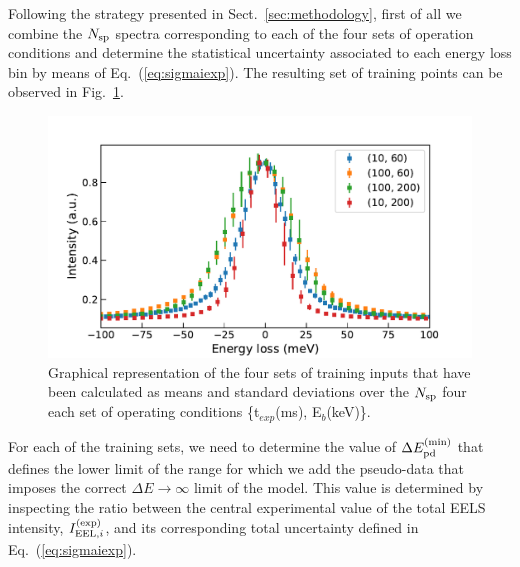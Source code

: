 Following the strategy presented in Sect.~\ref{sec:methodology}, first of all we combine the $N_{\rm sp}$ spectra
corresponding to each of the four sets of operation conditions and determine the statistical uncertainty
associated to each energy loss bin by means of Eq.~(\ref{eq:sigmaiexp}).
%
The resulting set of training points can be observed in Fig.~\ref{fig:training_points_vacuum}.

\begin{figure}[h]
    \centering
    \includegraphics[width=120mm]{plots/training_points_vacuum.pdf}
    \caption{Graphical representation of the four sets of training inputs
    that have been calculated as means and standard deviations over the
    $N_{\rm sp}$ four each set of operating conditions \{t$_{exp}$(ms), E$_b$(keV)\}.
      }
\label{fig:training_points_vacuum}
\end{figure}

For each of the training sets, we need to determine the value of $\Delta E_{\rm pd}^{\rm (min)}$
that defines the lower limit of the range for which we add the pseudo-data
that imposes the correct $\Delta E \to \infty$ limit of the model.
%
This value is determined
by inspecting the ratio between the central experimental value of the total
EELS intensity, $I_{{\rm EEL},i}^{(\rm exp)}$, and its corresponding
total uncertainty defined in Eq.~(\ref{eq:sigmaiexp}).

